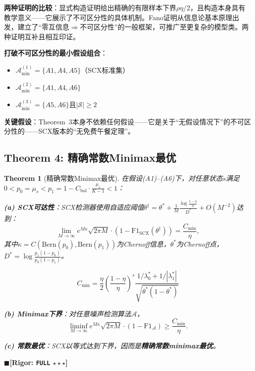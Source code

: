 \documentclass[12pt,a4paper]{ctexart}
\newtheorem{theorem}{Theorem}[section]
\theoremstyle{definition}
\theoremstyle{remark}
\newcommand{\rigorFull}{$\blacksquare$\;\textbf{[Rigor: \texttt{FULL} $\star\star\star$]}}
\begin{document}
\textbf{两种证明的比较}：显式构造证明给出精确的有限样本下界$\rho\eta/2$，且构造本身具有教学意义——它展示了不可区分性的具体机制。Fano证明从信息论基本原理出发，建立了``零互信息$\Rightarrow$不可区分性''的一般框架，可推广至更复杂的模型类。两种证明互补且相互印证。

\textbf{打破不可区分性的最小假设组合}：
\begin{itemize}
\item $\mathcal{A}_{\min}^{(1)} = \{A1, A4, A5\}$（SCX标准集）
\item $\mathcal{A}_{\min}^{(2)} = \{A1, A4, A6\}$
\item $\mathcal{A}_{\min}^{(3)} = \{A5, A6\}$且$|\mathcal{S}| \geq 2$
\end{itemize}

\textbf{关键假设}：Theorem~3本身不依赖任何假设——它是关于``无假设情况下''的不可区分性的——SCX版本的``无免费午餐定理''。

\subsection{Theorem 4: 精确常数Minimax最优}

\begin{theorem}[精确常数Minimax最优]
\label{thm:4}
在假设(A1)–(A6)下，对任意状态$s$满足$0 < p_0 = \mu_s < p_1 = 1 - C_{\text{bal}} \cdot \frac{\mu_s}{K-1} < 1$：

\textbf{(a) SCX可达性}：SCX检测器使用自适应阈值$\theta^\dagger = \theta^* + \frac{1}{M}\frac{\log\frac{1-\eta}{\eta}}{D^*} + O(M^{-2})$达到：
\begin{equation}
\lim_{M\to\infty} e^{M\kappa}\sqrt{2\pi M} \cdot (1 - \mathrm{F1}_{\text{SCX}}(\theta^\dagger)) = \frac{C_{\min}}{\eta},
\end{equation}
其中$\kappa = C(\mathrm{Bern}(p_0), \mathrm{Bern}(p_1))$为Chernoff信息，$\theta^*$为Chernoff点，$D^* = \log\frac{p_1(1-p_0)}{p_0(1-p_1)}$。

\begin{equation}
\boxed{C_{\min} = \frac{\eta}{2}\left(\frac{1-\eta}{\eta}\right)^s \frac{1/\lambda_0^* + 1/|\lambda_1^*|}{\sqrt{\theta^*(1-\theta^*)}}}
\end{equation}

\textbf{(b) Minimax下界}：对\textit{任意}噪声检测算法$\mathcal{A}$，
\begin{equation}
\liminf_{M\to\infty} e^{M\kappa}\sqrt{2\pi M} \cdot (1 - \mathrm{F1}_{\mathcal{A}}) \geq \frac{C_{\min}}{\eta}.
\end{equation}

\textbf{(c) 常数最优}：SCX以等式达到下界，因而是\textbf{精确常数minimax最优}。
\end{theorem}
\rigorFull
\end{document}
